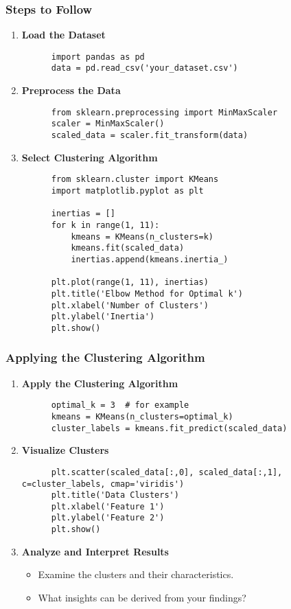 \documentclass[aspectratio=169]{beamer}
\begin{document}
\begin{frame}[fragile]
  \frametitle{Steps to Follow}
  \begin{enumerate}
    \item \textbf{Load the Dataset}
      \begin{lstlisting}
      import pandas as pd
      data = pd.read_csv('your_dataset.csv')
      \end{lstlisting}
      
    \item \textbf{Preprocess the Data}
      \begin{lstlisting}
      from sklearn.preprocessing import MinMaxScaler
      scaler = MinMaxScaler()
      scaled_data = scaler.fit_transform(data)
      \end{lstlisting}

    \item \textbf{Select Clustering Algorithm}
      \begin{lstlisting}
      from sklearn.cluster import KMeans
      import matplotlib.pyplot as plt
      
      inertias = []
      for k in range(1, 11):
          kmeans = KMeans(n_clusters=k)
          kmeans.fit(scaled_data)
          inertias.append(kmeans.inertia_)
      
      plt.plot(range(1, 11), inertias)
      plt.title('Elbow Method for Optimal k')
      plt.xlabel('Number of Clusters')
      plt.ylabel('Inertia')
      plt.show()
      \end{lstlisting}
  \end{enumerate}
\end{frame}

\begin{frame}[fragile]
  \frametitle{Applying the Clustering Algorithm}
  \begin{enumerate}[resume]
    \item \textbf{Apply the Clustering Algorithm}
      \begin{lstlisting}
      optimal_k = 3  # for example
      kmeans = KMeans(n_clusters=optimal_k)
      cluster_labels = kmeans.fit_predict(scaled_data)
      \end{lstlisting}

    \item \textbf{Visualize Clusters}
      \begin{lstlisting}
      plt.scatter(scaled_data[:,0], scaled_data[:,1], c=cluster_labels, cmap='viridis')
      plt.title('Data Clusters')
      plt.xlabel('Feature 1')
      plt.ylabel('Feature 2')
      plt.show()
      \end{lstlisting}

    \item \textbf{Analyze and Interpret Results}
      \begin{itemize}
        \item Examine the clusters and their characteristics.
        \item What insights can be derived from your findings?
      \end{itemize}
  \end{enumerate}
\end{frame}
\end{document}
